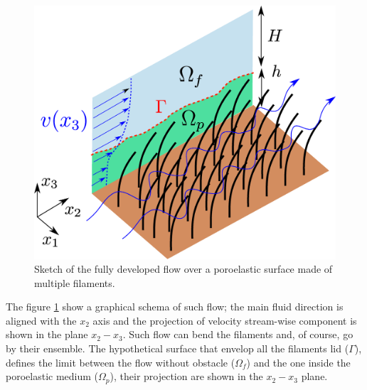 \begin{figure}[h]
	\centering
	\includegraphics[width=0.7\linewidth]{chapter_1/problem_schema}
	\caption{Sketch of the fully developed flow over a poroelastic surface made of multiple filaments.}
	\label{fig:schema_problem}
\end{figure}

The figure \ref{fig:schema_problem} show a graphical schema of such flow; the main fluid direction is aligned with the $x_2$ axis and the projection of velocity stream-wise component is shown in the plane $x_2 - x_3$.
Such flow can bend the filaments and, of course, go by their ensemble.
The hypothetical surface that envelop all the filaments lid ($\Gamma$), defines the limit between the flow without obstacle ($\Omega_{f}$) and the one inside the poroelastic medium ($\Omega_{p}$), their projection are shown in the  $x_2 - x_3$ plane.

